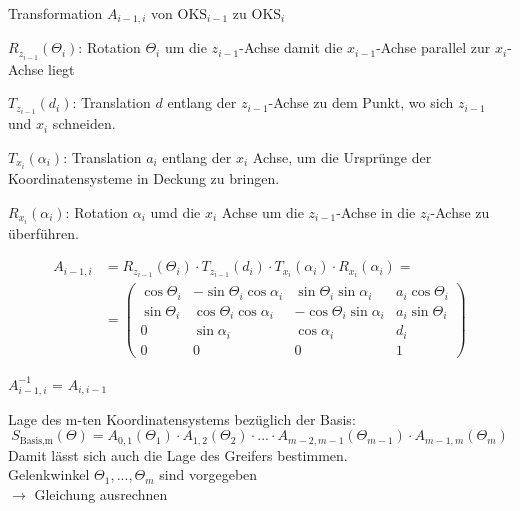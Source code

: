 Transformation $A_{i-1,i}$ von $\text{OKS}_{i-1}$ zu $\text{OKS}_i$
\begin{compactitem}
    \item $R_{z_{i-1}}(\Theta_i)$: Rotation $\Theta_{i}$ um die $z_{i-1}$-Achse damit die $x_{i-1}$-Achse parallel zur
    $x_{i}$-Achse liegt
    \item $T_{z_{i-1}}(d_i)$: Translation $d$ entlang der $z_{i-1}$-Achse zu dem Punkt, wo sich $z_{i-1}$ und $x_{i}$
    schneiden.
    \item $T_{x_i}(\alpha_i)$: Translation $a_i$ entlang der $x_i$ Achse, um die Ursprünge der Koordinatensysteme in
    Deckung zu bringen.
    \item $R_{x_i}(\alpha_i)$: Rotation $\alpha_{i}$ umd die $x_{i}$ Achse um die $z_{i-1}$-Achse in die
    $z_{i}$-Achse zu überführen.
\end{compactitem}
\begin{align}
    A_{i-1,i} &= R_{z_{i-1}}(\Theta_i) \cdot T_{z_{i-1}}(d_i) \cdot T_{x_i}(\alpha_i) \cdot R_{x_i}(\alpha_i) = \\
    &= \begin{pmatrix} \cos\Theta_i&-\sin\Theta_i\cos\alpha_i&\sin\Theta_i\sin\alpha_i&a_i\cos\Theta_i \\ \sin\Theta_i&\cos\Theta_i\cos\alpha_i &-\cos\Theta_i\sin\alpha_i &a_i\sin\Theta_i \\ 0&\sin\alpha_i&\cos\alpha_i&d_i \\0&0&0&1 \end{pmatrix}
\end{align}

$A^{-1}_{i-1,i}$ = $A_{i,i-1}$

Lage des m-ten Koordinatensystems bezüglich der Basis:
\begin{displaymath}
     S_\text{Basis,m}(\Theta) = A_{0,1}(\Theta_1) \cdot A_{1,2}(\Theta_2) \cdot ... \cdot
     A_{m-2,m-1}(\Theta_{m-1}) \cdot A_{m-1,m}(\Theta_m)
\end{displaymath}
Damit lässt sich auch die Lage des Greifers bestimmen. \\
Gelenkwinkel $\Theta_1, ... ,\Theta_m$ sind vorgegeben \\
$\rightarrow$ Gleichung ausrechnen


